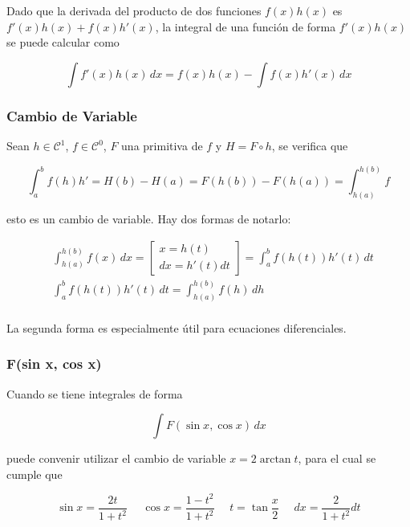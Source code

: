 Dado que la derivada del producto de dos funciones $f(x)h(x)$ es $f'(x)h(x)+f(x)h'(x)$, la integral de una función de forma $f'(x)h(x)$ se puede calcular como

\[\int f'(x)h(x)\,dx = f(x)h(x) - \int f(x)h'(x)\,dx\]

\subsubsection{Cambio de Variable}

Sean $h \in \mathcal{C}^1$, $f\in\mathcal{C}^0$, $F$ una primitiva de $f$ y $H = F \circ h$, se verifica que

\[\int^b_af(h)h'=H(b)-H(a)=F(h(b))-F(h(a))=\int^{h(b)}_{h(a)}f\]

esto es un cambio de variable. Hay dos formas de notarlo:

\begin{equation}
\begin{split}
    &\int^{h(b)}_{h(a)}f(x)\,dx =
    \begin{bmatrix}
    x = h(t)\\
    dx= h'(t)dt
    \end{bmatrix} = \int^b_af(h(t))h'(t)\,dt\\
    &\int^b_af(h(t))h'(t)\,dt = \int^{h(b)}_{h(a)} f(h)\,dh\\
\end{split}
\nonumber
\end{equation}

La segunda forma es especialmente útil para ecuaciones diferenciales.

\subsubsection{F(sin x, cos x)}

Cuando se tiene integrales de forma

\[\int F(\sin{x}, \cos{x})\,dx\]

puede convenir utilizar el cambio de variable $x = 2\arctan{t}$, para el cual se cumple que

\begin{minipage}{0.55\textwidth}
\begin{equation}
    \sin{x}=\frac{2t}{1+t^2}\,\,\,\,\,\,\,\,
    \cos{x}=\frac{1-t^2}{1+t^2}\,\,\,\,\,\,\,\,
    t=\tan{\frac{x}{2}}\,\,\,\,\,\,\,\,
    dx=\frac{2}{1+t^2}dt
\nonumber
\end{equation}
\end{minipage}

